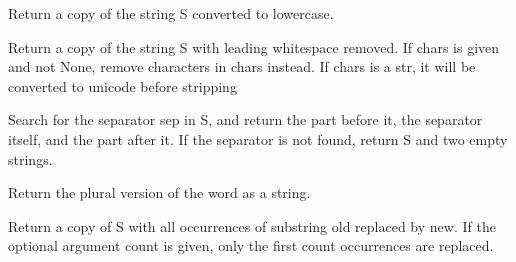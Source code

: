 \documentclass[letterpaper,10pt,english]{sphinxmanual}
\begin{document}
\begin{fulllineitems}

\begin{fulllineitems}
\label{api_reference:textblob_de.blob.Word.lower}
Return a copy of the string S converted to lowercase.

\end{fulllineitems}


\begin{fulllineitems}
\label{api_reference:textblob_de.blob.Word.lstrip}
Return a copy of the string S with leading whitespace removed.
If chars is given and not None, remove characters in chars instead.
If chars is a str, it will be converted to unicode before stripping

\end{fulllineitems}


\begin{fulllineitems}
\label{api_reference:textblob_de.blob.Word.partition}
Search for the separator sep in S, and return the part before it,
the separator itself, and the part after it.  If the separator is not
found, return S and two empty strings.

\end{fulllineitems}


\begin{fulllineitems}
\label{api_reference:textblob_de.blob.Word.pluralize}
Return the plural version of the word as a string.

\end{fulllineitems}


\begin{fulllineitems}
\label{api_reference:textblob_de.blob.Word.replace}
Return a copy of S with all occurrences of substring
old replaced by new.  If the optional argument count is
given, only the first count occurrences are replaced.


\end{fulllineitems}
\end{fulllineitems}
\end{document}
